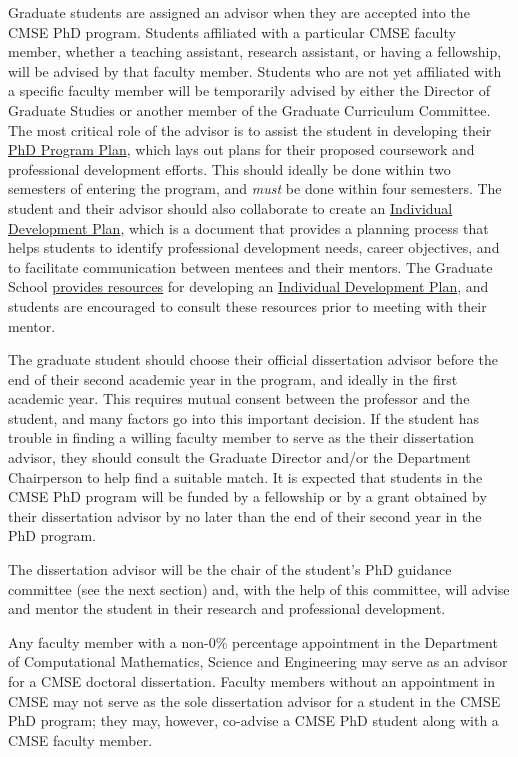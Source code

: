 Graduate students are assigned an advisor when they are accepted into
the CMSE PhD program.  Students affiliated with a particular CMSE
faculty member, whether a teaching assistant, research assistant, or
having a fellowship, will be advised by that faculty member.  Students
who are not yet affiliated with a specific faculty member will be
temporarily advised by either the Director of Graduate Studies or
another member of the Graduate Curriculum Committee.  The most
critical role of the advisor is to assist the student in developing
their \href{https://login.msu.edu/?App=J3205}{PhD Program Plan}, which
lays out plans for their proposed coursework and professional
development efforts.  This should ideally be done within two semesters
of entering the program, and \textit{must} be done within four
semesters.  The student and their advisor should also collaborate  to create an
\href{http://caffe.grd.msu.edu/IDP}{Individual Development Plan},
which is a document that provides a planning process that helps
students to identify professional development needs, career
objectives, and to facilitate communication between mentees and their
mentors.  The Graduate School
\href{https://grad.msu.edu/prep}{provides resources} for developing an
\href{http://caffe.grd.msu.edu/IDP}{Individual Development Plan}, and
students are encouraged to consult these resources prior to meeting
with their mentor.

The graduate student should choose their official dissertation advisor
before the end of their second academic year in the program, and
ideally in the first academic year.  This requires mutual consent
between the professor and the student, and many factors go into this
important decision.  If the student has trouble in finding a willing
faculty member to serve as the their dissertation advisor, they should
consult the Graduate Director and/or the Department Chairperson to
help find a suitable match.  It is expected that students in the CMSE
PhD program will be funded by a fellowship or by a grant obtained by
their dissertation advisor by no later than the end of their second
year in the PhD program.

The dissertation advisor will be the chair of the student's PhD
guidance committee (see the next section) and, with the help of this
committee, will advise and mentor the student in their research and
professional development.  

Any faculty member with a non-0\% percentage appointment in the
Department of Computational Mathematics, Science and Engineering may
serve as an advisor for a CMSE doctoral dissertation.  Faculty members
without an appointment in CMSE may not serve as the sole dissertation
advisor for a student in the CMSE PhD program; they may, however,
co-advise a CMSE PhD student along with a CMSE faculty member.

